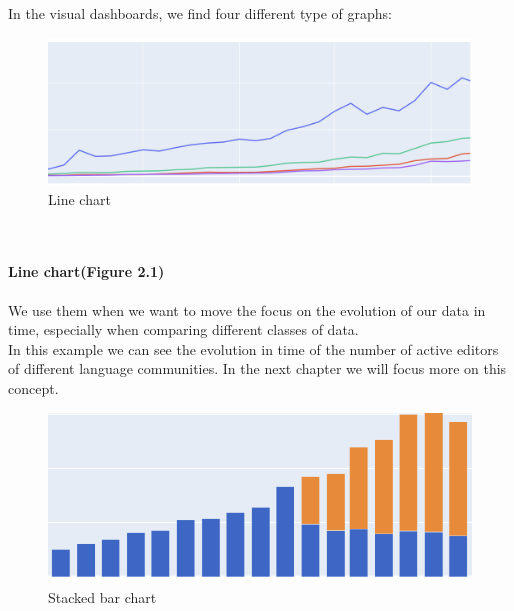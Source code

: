 In the visual dashboards, we find four different type of graphs:
\begin{figure}[!ht]
  \centering
  \includegraphics[width=5in]{img/line_chart.png}
  \caption{Line chart}
  \label{fig2.2}
\end{figure}
\\
\pagebreak
\paragraph{Line chart(Figure 2.1)}
We use them when we want to move the focus on the evolution of our data in time, especially when comparing different classes of data.\\
In this example we can see the evolution in time of the number of active editors of different language communities. In the next chapter we will focus more on this concept.
\\
\begin{figure}[!ht]
  \centering
  \includegraphics[width=5in]{img/stacked_barchart.png}
  \caption{Stacked bar chart}
  \label{fig2.3}
\end{figure}
\\
